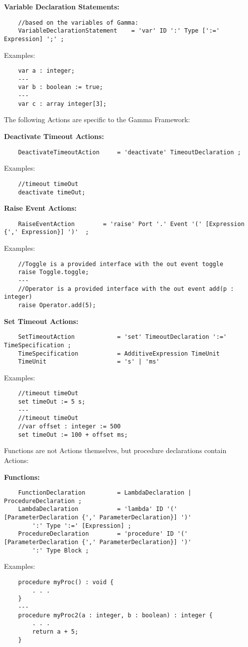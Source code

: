 \textbf{Variable Declaration Statements:}
\begin{lstlisting}
	//based on the variables of Gamma:
	VariableDeclarationStatement 	= 'var' ID ':' Type [':=' Expression] ';' ;	
\end{lstlisting}
Examples:
\begin{lstlisting}
	var a : integer;
	---
	var b : boolean := true;
	---
	var c : array integer[3];
\end{lstlisting}

\bigskip
The following Actions are specific to the Gamma Framework:

\textbf{Deactivate Timeout Actions:}
\begin{lstlisting}
	DeactivateTimeoutAction 	= 'deactivate' TimeoutDeclaration ;
\end{lstlisting}
Examples:
\begin{lstlisting}
	//timeout timeOut
	deactivate timeOut;
\end{lstlisting}

\textbf{Raise Event Actions:}
\begin{lstlisting}
	RaiseEventAction 		= 'raise' Port '.' Event '(' [Expression {',' Expression}] ')'  ;	
\end{lstlisting}
Examples:
\begin{lstlisting}
	//Toggle is a provided interface with the out event toggle
	raise Toggle.toggle;
	---
	//Operator is a provided interface with the out event add(p : integer)
	raise Operator.add(5);
\end{lstlisting}

\textbf{Set Timeout Actions:}
\begin{lstlisting}
	SetTimeoutAction 			= 'set' TimeoutDeclaration ':=' TimeSpecification ;	
	TimeSpecification 			= AdditiveExpression TimeUnit
	TimeUnit 					= 's' | 'ms'
\end{lstlisting}
Examples:
\begin{lstlisting}
	//timeout timeOut
	set timeOut := 5 s;
	---
	//timeout timeOut
	//var offset : integer := 500
	set timeOut := 100 + offset ms;
\end{lstlisting}

\bigskip
Functions are not Actions themselves, but procedure declarations contain Actions:

\textbf{Functions:}
\begin{lstlisting}
	FunctionDeclaration 		= LambdaDeclaration | ProcedureDeclaration ;
	LambdaDeclaration 			= 'lambda' ID '(' [ParameterDeclaration {',' ParameterDeclaration}] ')' 
		':' Type ':=' [Expression] ;
	ProcedureDeclaration		= 'procedure' ID '(' [ParameterDeclaration {',' ParameterDeclaration}] ')' 
		':' Type Block ;

\end{lstlisting}
Examples:
\begin{lstlisting}
	procedure myProc() : void {
		. . .
	}
	---
	procedure myProc2(a : integer, b : boolean) : integer {
		. . .
		return a + 5;
	}
\end{lstlisting}

